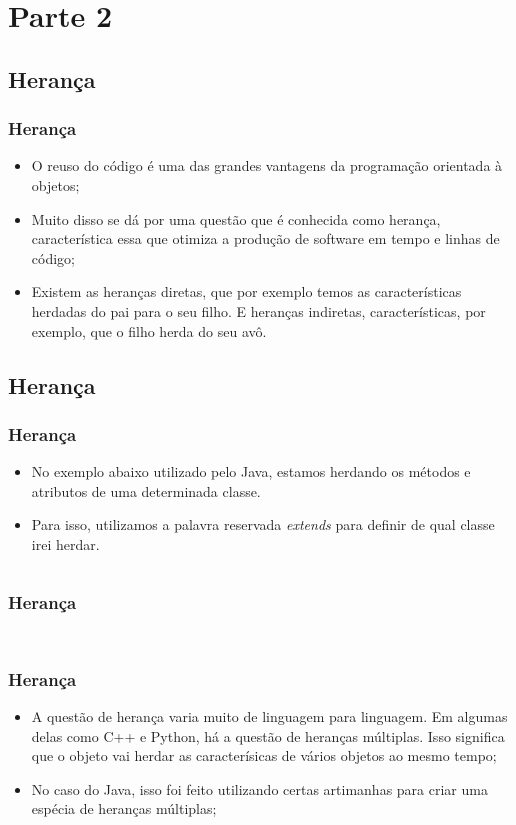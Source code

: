 \documentclass{beamer}
\begin{document}
\section{Parte 2}
\subsection{Herança}
\begin{frame}
	\frametitle{Herança}
	\begin{itemize}
		\item O reuso do código é uma das grandes vantagens da programação orientada à objetos;
		\item Muito disso se dá por uma questão que é conhecida como herança, característica essa que otimiza a produção de software em tempo e linhas de código;
		\item Existem as heranças diretas, que por exemplo temos as características herdadas do pai para o seu filho. E heranças indiretas, características, por exemplo, que o filho herda do seu avô.
	\end{itemize}
\end{frame}
\subsection{Herança}
\begin{frame}
	\frametitle{Herança}
	\begin{itemize}
		\item No exemplo abaixo utilizado pelo Java, estamos herdando os métodos e atributos de uma determinada classe.
		\item Para isso, utilizamos a palavra reservada \textit{extends} para definir de qual classe irei herdar.
	\end{itemize}
	\inputminted{java}{codigos/Carro.java}
\end{frame}
\begin{frame}
	\frametitle{Herança}
	\inputminted{java}{codigos/Automovel.java}
	\inputminted{java}{codigos/Carro.java}
\end{frame}
\begin{frame}
	\frametitle{Herança}
	\begin{itemize}
		\item A questão de herança varia muito de linguagem para linguagem. Em algumas delas como C++ e Python, há a questão de heranças múltiplas. Isso significa que o objeto vai herdar as caracterísicas de vários objetos ao mesmo tempo;
		\item No caso do Java, isso foi feito utilizando certas artimanhas para criar uma espécia de heranças múltiplas;
	\end{itemize}
\end{frame}
\end{document}
